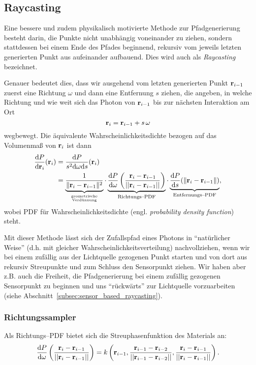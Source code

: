	\subsection{Raycasting}
	Eine bessere und zudem physikalisch motivierte Methode zur Pfadgenerierung besteht darin, die Punkte nicht unabhängig voneinander zu ziehen, sondern stattdessen bei einem Ende des Pfades beginnend, rekursiv vom jeweils letzten generierten Punkt aus aufeinander aufbauend. Dies wird auch als {\em Raycasting} bezeichnet.
	
	Genauer bedeutet dies, dass wir ausgehend vom letzten generierten Punkt $\mathbf{r}_{i-1}$ zuerst eine Richtung $\omega$ und dann eine Entfernung $s$ ziehen, die angeben, in welche Richtung und wie weit sich das Photon von $\mathbf{r}_{i-1}$ bis zur nächsten Interaktion am Ort
	$$\mathbf{r}_i=\mathbf{r}_{i-1}+s\,\omega$$
	wegbewegt.
	Die äquivalente Wahrscheinlichkeitsdichte bezogen auf das Volumenmaß von $\mathbf{r}_i$ ist dann
	\begin{align*}
		\frac{\text{d}P}{\text{d}\mathbf{r}_i}(\mathbf{r}_i) &= \frac{\text{d}P}{s^2 \text{d}\omega\text{d}s}(\mathbf{r}_i) \\
		&= \underbrace{\frac{1}{\|\mathbf{r}_i - \mathbf{r}_{i-1}\|^2}}_{\text{geometrische}\atop\text{Verdünnung}} \cdot\underbrace{\frac{\text{d}P}{\text{d}\omega}\left(\frac{\mathbf{r}_i - \mathbf{r}_{i-1}}{||\mathbf{r}_i - \mathbf{r}_{i-1}||}\right)}_{\text{Richtungs--PDF}} \cdot \underbrace{\frac{\text{d}P}{\text{d}s}(\|\mathbf{r}_i-\mathbf{r}_{i-1}\|)}_{\text{Entfernungs--PDF}},
	\end{align*}
	wobei PDF für Wahrscheinlichkeitsdichte (engl. {\em probability density function}) steht.
	
	Mit dieser Methode lässt sich der Zufallspfad eines Photons in ``natürlicher Weise'' (d.h. mit gleicher Wahrscheinlichkeitsverteilung) nachvollziehen, wenn wir bei einem zufällig aus der Lichtquelle gezogenen Punkt starten und von dort aus rekursiv Streupunkte und zum Schluss den Sensorpunkt ziehen. Wir haben aber z.B. auch die Freiheit, die Pfadgenerierung bei einem zufällig gezogenen Sensorpunkt zu beginnen und uns ``rückwärts'' zur Lichtquelle vorzuarbeiten (siehe Abschnitt~\ref{subsec:sensor_based_raycasting}).
	
	\subsubsection{Richtungssampler}
	Als Richtungs--PDF bietet sich die Streuphasenfunktion des Materials an:
	\begin{equation*}
		\frac{\text{d}P}{\text{d}\omega}\left(\frac{\mathbf{r}_i - \mathbf{r}_{i-1}}{||\mathbf{r}_i - \mathbf{r}_{i-1}||}\right) = k\left(\mathbf{r}_{i-1},\frac{\mathbf{r}_{i-1} - \mathbf{r}_{i-2}}{||\mathbf{r}_{i-1} - \mathbf{r}_{i-2}||},\frac{\mathbf{r}_i - \mathbf{r}_{i-1}}{||\mathbf{r}_i - \mathbf{r}_{i-1}||}\right).
		\label{eq:direction_pdf}
	\end{equation*}
	
